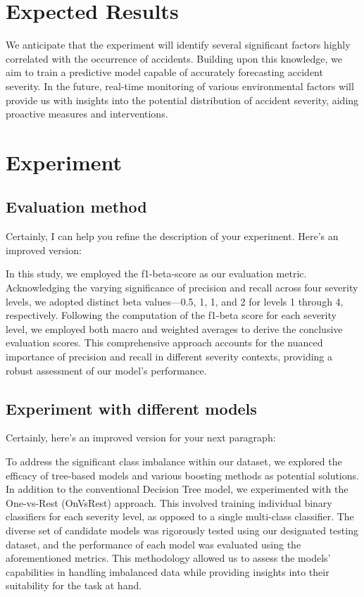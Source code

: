 \documentclass[10pt,twocolumn,letterpaper]{article}
\begin{document}
\begin{CJK}{UTF8}{bsmi}
\section{Expected Results}
We anticipate that the experiment will identify several significant factors highly correlated with the occurrence of accidents. Building upon this knowledge, we aim to train a predictive model capable of accurately forecasting accident severity. In the future, real-time monitoring of various environmental factors will provide us with insights into the potential distribution of accident severity, aiding proactive measures and interventions.

\section{Experiment}

\subsection{Evaluation method}
Certainly, I can help you refine the description of your experiment. Here's an improved version:

In this study, we employed the f1-beta-score as our evaluation metric. Acknowledging the varying significance of precision and recall across four severity levels, we adopted distinct beta values—0.5, 1, 1, and 2 for levels 1 through 4, respectively. Following the computation of the f1-beta score for each severity level, we employed both macro and weighted averages to derive the conclusive evaluation scores. This comprehensive approach accounts for the nuanced importance of precision and recall in different severity contexts, providing a robust assessment of our model's performance.

\subsection{Experiment with different models}
Certainly, here's an improved version for your next paragraph:

To address the significant class imbalance within our dataset, we explored the efficacy of tree-based models and various boosting methods as potential solutions. In addition to the conventional Decision Tree model, we experimented with the One-vs-Rest (OnVsRest) approach. This involved training individual binary classifiers for each severity level, as opposed to a single multi-class classifier. The diverse set of candidate models was rigorously tested using our designated testing dataset, and the performance of each model was evaluated using the aforementioned metrics. This methodology allowed us to assess the models' capabilities in handling imbalanced data while providing insights into their suitability for the task at hand.


\end{CJK}
\end{document}
